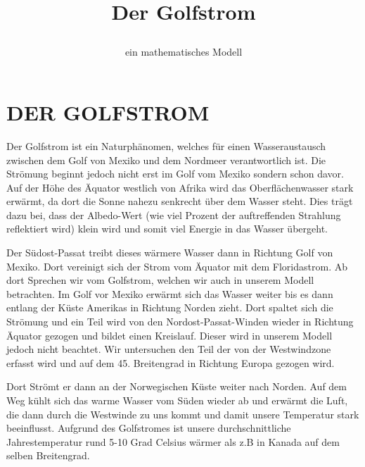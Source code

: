 \documentclass[a4paper,twoside]{article}
\begin{document}
	\title{Der Golfstrom\subtitle{ein mathematisches Modell} }
	
	\author{}
	

	
	\onecolumn \maketitle \normalsize \vfill

	\section{\uppercase{Der Golfstrom}}\label{sec:Golfstrom}

	\noindent Der Golfstrom ist ein Naturphänomen, welches für einen Wasseraustausch zwischen dem Golf von Mexiko und dem Nordmeer verantwortlich ist. Die Strömung beginnt jedoch nicht erst im Golf vom Mexiko sondern schon davor. Auf der Höhe des Äquator westlich von Afrika wird das Oberflächenwasser stark erwärmt, da dort die Sonne nahezu senkrecht über dem Wasser steht. Dies trägt dazu bei, dass der Albedo-Wert (wie viel Prozent der auftreffenden Strahlung reflektiert wird) klein wird und somit viel Energie in das Wasser übergeht.

	Der Südost-Passat treibt dieses wärmere Wasser dann in Richtung Golf von Mexiko. Dort vereinigt sich der Strom vom Äquator mit dem Floridastrom. Ab dort Sprechen wir vom Golfstrom, welchen wir auch in unserem Modell betrachten. Im Golf vor Mexiko erwärmt sich das Wasser weiter bis es dann entlang der Küste Amerikas in Richtung Norden zieht. Dort spaltet sich die Strömung und ein Teil wird von den Nordost-Passat-Winden wieder in Richtung Äquator gezogen und bildet einen Kreislauf. Dieser wird in unserem Modell jedoch nicht beachtet. Wir untersuchen den Teil der von der Westwindzone erfasst wird und auf dem 45. Breitengrad in Richtung Europa gezogen wird.

	Dort Strömt er dann an der Norwegischen Küste weiter nach Norden. Auf dem Weg kühlt sich das warme Wasser vom Süden wieder ab und erwärmt die Luft, die dann durch die Westwinde zu uns kommt und damit unsere Temperatur stark beeinflusst. Aufgrund des Golfstromes ist unsere durchschnittliche Jahrestemperatur rund 5-10 Grad Celsius wärmer als z.B in Kanada auf dem selben Breitengrad. 
\end{document}
